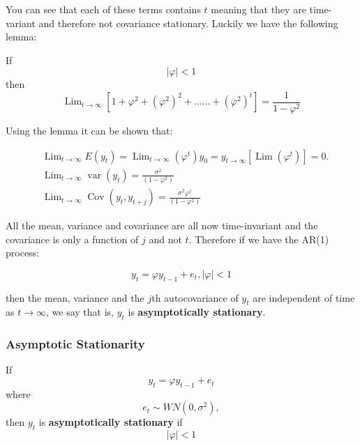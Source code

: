 \documentclass[11pt]{article}
\begin{document}
You can see that each of these terms contains $t$ meaning that they are time-variant and therefore not covariance stationary. Luckily we have the following lemma:

\begin{lemma}
If 
\[|\varphi|<1\]
then
\begin{equation}
\operatorname{Lim}_{t \rightarrow \infty}\left[1+\varphi^2+\left(\varphi^2\right)^2+\ldots \ldots+\left(\varphi^2\right)^t\right]=\frac{1}{1-\varphi^2}
\end{equation}
\end{lemma}

Using the lemma it can be shown that:

\begin{equation}
\begin{aligned}
& \operatorname{Lim}_{t \rightarrow \infty} E\left(y_t\right)=\operatorname{Lim}_{t \rightarrow \infty}\left(\varphi^t\right) y_0=y_{t \rightarrow \infty}\left[\operatorname{Lim}\left(\varphi^t\right)\right]=0 . \\
& \operatorname{Lim}_{t \rightarrow \infty} \operatorname{var}\left(y_t\right)=\frac{\sigma^2}{\left(1-\varphi^2\right)} \\
& \operatorname{Lim}_{t \rightarrow \infty} \operatorname{Cov}\left(y_t, y_{t+j}\right)=\frac{\sigma^2 \varphi^j}{\left(1-\varphi^2\right)}
\end{aligned}
\end{equation}

All the mean, variance and covariance are all now time-invariant and the covariance is only a function of $j$ and not $t$. Therefore if we have the AR(1) process:

\[y_t = \varphi y_{t-1} + e_t, |\varphi|<1\]

then the mean, variance and the $j$th autocovariance of $y_t$ are independent of time as $t\rightarrow\infty$, we say that is, $y_t$ is \textbf{asymptotically stationary}.

\begin{mdframed}
    \subsubsection*{Asymptotic Stationarity}

    \begin{theorem}
        If
        \[y_t = \varphi y_{t-1} + e_t\]
        where
        \[e_t \sim WN(0,\sigma^2),\]
        then $y_t$ is \textbf{asymptotically stationary} if
        \[|\varphi| <1\]
    \end{theorem}
\end{mdframed}
\end{document}
